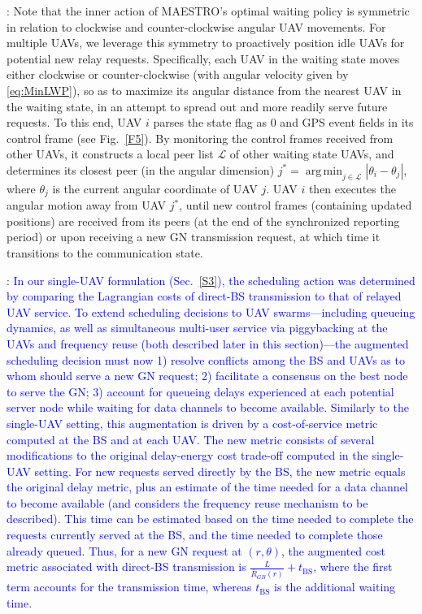 \documentclass[12pt, draftcls, onecolumn]{IEEEtran}
\theoremstyle{plain}
\theoremstyle{definition}
\theoremstyle{remark}
\DeclareMathOperator*{\argmin}{arg\,min}
\newcommand\hlt[1]{\textcolor{blue}{#1}}
\begin{document}
: Note that the inner action of MAESTRO's optimal waiting policy is symmetric in relation to clockwise and counter-clockwise angular UAV movements. For multiple UAVs, we leverage this symmetry to proactively position idle UAVs for potential new relay requests. Specifically, each UAV in the waiting state moves either clockwise or counter-clockwise (with angular velocity given by \eqref{eq:MinLWP}), so as to maximize its angular distance from the nearest UAV in the waiting state, in an attempt to spread out and more readily serve future requests. To this end, UAV $i$ parses the state flag as 0 and GPS event fields in its control frame (see Fig.~\ref{F5}). By monitoring the control frames received from other UAVs, it constructs a local peer list $\mathcal{L}$ of other waiting state UAVs, and determines its closest peer (in the angular dimension) $j^{*}{=}\argmin_{j{\in}\mathcal{L}}|\theta_{i}{-}\theta_{j}|$, where $\theta_{j}$ is the current angular coordinate of UAV $j$. UAV $i$ then executes the angular motion away from UAV $j^*$, until new control frames (containing updated positions) are received from its peers (at the end of the synchronized reporting period) or upon receiving a new GN transmission request, at which time it transitions to the communication state.

\noindent{\textbf{\hlt{Consensus-driven Conflict Resolution}}}: \hlt{In our single-UAV formulation (Sec.~\ref{S3}), the scheduling action was determined by comparing the Lagrangian costs of direct-BS transmission to that of relayed UAV service. To extend scheduling decisions to UAV swarms---including queueing dynamics, as well as simultaneous multi-user service via piggybacking at the UAVs and frequency reuse (both described later in this section)---the augmented scheduling decision must now 1) resolve conflicts among the BS and UAVs as to whom should serve a new GN request; 2) facilitate a consensus on the best node to serve the GN; 3) account for queueing delays experienced at each potential server node while waiting for data channels to become available. Similarly to the single-UAV setting, this augmentation is driven by a cost-of-service metric computed at the BS and at each UAV. The new metric consists of several modifications to the original delay-energy cost trade-off computed in the single-UAV setting. For new requests served directly by the BS, the new metric equals the original delay metric, plus an estimate of the time needed for a data channel to become available (and considers the frequency reuse mechanism to be described). This time can be estimated based on the time needed to complete the requests currently served at the BS, and the time needed to complete those already queued. Thus, for a new GN request at $(r,\theta)$, the augmented cost metric associated with direct-BS transmission is $\frac{L}{\bar{R}_{GB}(r)}{+}t_{\mathrm{BS}}$, where the first term accounts for the transmission time, whereas $t_{\mathrm{BS}}$ is the additional waiting time.}
\end{document}
